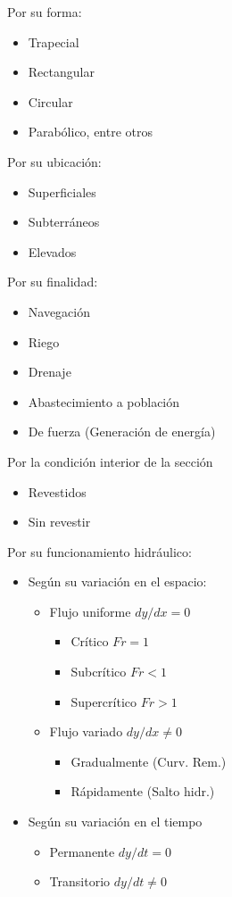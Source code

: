 Por su forma:
\begin{itemize}
    \item Trapecial
    \item Rectangular
    \item Circular
    \item Parabólico, entre otros
\end{itemize}
Por su ubicación:
\begin{itemize}
    \item Superficiales
    \item Subterráneos
    \item Elevados
\end{itemize}
Por su finalidad:
\begin{itemize}
    \item Navegación
    \item Riego
    \item Drenaje
    \item Abastecimiento a población
    \item De fuerza (Generación de energía)
\end{itemize}
Por la condición interior de la sección
\begin{itemize}
    \item Revestidos
    \item Sin revestir
\end{itemize}
Por su funcionamiento hidráulico:
\begin{itemize}
    \item Según su variación en el espacio:\begin{itemize}
        \item Flujo uniforme $dy/dx=0$\begin{itemize}
            \item Crítico $Fr=1$
            \item Subcrítico $Fr<1$
            \item Supercrítico $Fr>1$
        \end{itemize}
        \item Flujo variado $dy/dx\neq 0$\begin{itemize}
            \item Gradualmente (Curv. Rem.)
            \item Rápidamente (Salto hidr.)
        \end{itemize}
    \end{itemize}
    \item Según su variación en el tiempo \begin{itemize}
        \item Permanente $dy/dt=0$
        \item Transitorio $dy/dt\neq 0$
    \end{itemize}
\end{itemize}

